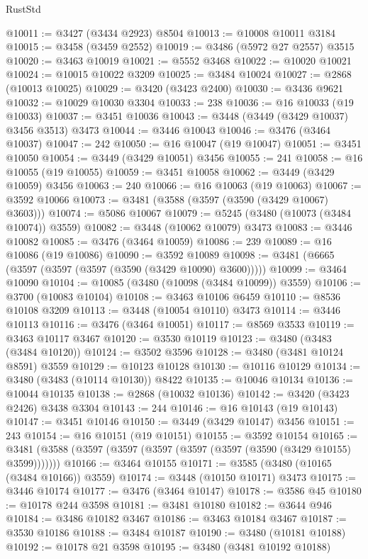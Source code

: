 \begin{lexlean}{RustStd}
\begin{coremodule}
{{{{{{{{{{{{{{{{{{{@10011 := @3427 (@3434 @2923) @8504
@10013 := @10008 @10011 @3184
@10015 := @3458 (@3459 @2552)
@10019 := @3486 (@5972 @27 @2557) @3515
@10020 := @3463 @10019
@10021 := @5552 @3468
@10022 := @10020 @10021
@10024 := @10015 @10022 @3209
@10025 := @3484 @10024
@10027 := @2868 (@10013 @10025)
@10029 := @3420 (@3423 @2400)
@10030 := @3436 @9621
@10032 := @10029 @10030 @3304
@10033 := 238
@10036 := @16 @10033 (@19 @10033)
@10037 := @3451 @10036
@10043 := @3448 (@3449 (@3429 @10037) @3456 @3513) @3473
@10044 := @3446 @10043
@10046 := @3476 (@3464 @10037)
@10047 := 242
@10050 := @16 @10047 (@19 @10047)
@10051 := @3451 @10050
@10054 := @3449 (@3429 @10051) @3456
@10055 := 241
@10058 := @16 @10055 (@19 @10055)
@10059 := @3451 @10058
@10062 := @3449 (@3429 @10059) @3456
@10063 := 240
@10066 := @16 @10063 (@19 @10063)
@10067 := @3592 @10066
@10073 := @3481 (@3588 (@3597 (@3590 (@3429 @10067) @3603)))
@10074 := @5086 @10067
@10079 := @5245 (@3480 (@10073 (@3484 @10074)) @3559)
@10082 := @3448 (@10062 @10079) @3473
@10083 := @3446 @10082
@10085 := @3476 (@3464 @10059)
@10086 := 239
@10089 := @16 @10086 (@19 @10086)
@10090 := @3592 @10089
@10098 := @3481 (@6665 (@3597 (@3597 (@3597 (@3590 (@3429 @10090) @3600)))))
@10099 := @3464 @10090
@10104 := @10085 (@3480 (@10098 (@3484 @10099)) @3559)
@10106 := @3700 (@10083 @10104)
@10108 := @3463 @10106 @6459
@10110 := @8536 @10108 @3209
@10113 := @3448 (@10054 @10110) @3473
@10114 := @3446 @10113
@10116 := @3476 (@3464 @10051)
@10117 := @8569 @3533
@10119 := @3463 @10117 @3467
@10120 := @3530 @10119
@10123 := @3480 (@3483 (@3484 @10120))
@10124 := @3502 @3596
@10128 := @3480 (@3481 @10124 @8591) @3559
@10129 := @10123 @10128
@10130 := @10116 @10129
@10134 := @3480 (@3483 (@10114 @10130)) @8422
@10135 := @10046 @10134
@10136 := @10044 @10135
@10138 := @2868 (@10032 @10136)
@10142 := @3420 (@3423 @2426) @3438 @3304
@10143 := 244
@10146 := @16 @10143 (@19 @10143)
@10147 := @3451 @10146
@10150 := @3449 (@3429 @10147) @3456
@10151 := 243
@10154 := @16 @10151 (@19 @10151)
@10155 := @3592 @10154
@10165 := @3481 (@3588 (@3597 (@3597 (@3597 (@3597 (@3597 (@3590 (@3429 @10155) @3599)))))))
@10166 := @3464 @10155
@10171 := @3585 (@3480 (@10165 (@3484 @10166)) @3559)
@10174 := @3448 (@10150 @10171) @3473
@10175 := @3446 @10174
@10177 := @3476 (@3464 @10147)
@10178 := @3586 @45
@10180 := @10178 @244 @3598
@10181 := @3481 @10180
@10182 := @3644 @946
@10184 := @3486 @10182 @3467
@10186 := @3463 @10184 @3467
@10187 := @3530 @10186
@10188 := @3484 @10187
@10190 := @3480 (@10181 @10188)
@10192 := @10178 @21 @3598
@10195 := @3480 (@3481 @10192 @10188)
}}}}}}}}}}}}}}}}}}}
\end{coremodule}
\end{lexlean}
